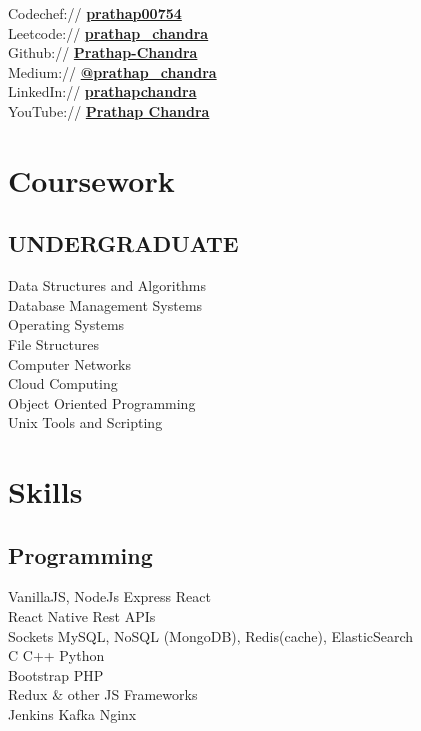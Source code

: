 \documentclass[]{deedy-resume-openfont}
\begin{document}
\begin{minipage}[t]{0.33\textwidth}
Codechef://  \href{https://www.codechef.com/users/prathap00754}{\bf prathap00754} \\
Leetcode://  \href{https://leetcode.com/prathap_chandra/}{\bf prathap\_chandra} \\
Github:// \href{https://github.com/Prathap-Chandra}{\bf Prathap-Chandra} \\
Medium:// \href{https://medium.com/@prathap_chandra/}{\bf @prathap\_chandra} \\
LinkedIn://  \href{https://www.linkedin.com/in/prathapchandra}{\bf prathapchandra} \\
YouTube://  \href{https://www.youtube.com/channel/UChfA9tIKEAduV_kxuHyAIkA}{\bf Prathap Chandra} \\


\section{Coursework}
\subsection{UNDERGRADUATE}
Data Structures and Algorithms\\
Database Management Systems\\
Operating Systems\\
File Structures\\
Computer Networks\\
Cloud Computing\\
Object Oriented Programming\\
Unix Tools and Scripting\\
\sectionsep


\section{Skills}
\subsection{Programming}
VanillaJS, NodeJs \textbullet{} Express \textbullet{} 
React \\ \textbullet{} React Native \textbullet{} Rest APIs\\
\textbullet{} Sockets \textbullet{}
\textbullet{} MySQL, NoSQL (MongoDB),
Redis(cache), ElasticSearch\\ 
\textbullet{} C \textbullet{} C++ \textbullet{} Python\\
\textbullet{} Bootstrap \textbullet{} PHP\\
\textbullet{} Redux \& other JS Frameworks\\
\textbullet{} Jenkins \textbullet{} Kafka \textbullet{} Nginx
\sectionsep


\end{minipage}
\end{document}
